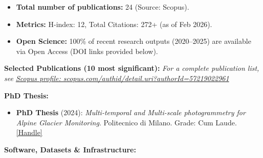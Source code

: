 \documentclass{cv_style} %
\begin{document}
\begin{itemize}[nosep]
    \item \textbf{Total number of publications:} 24 (Source: Scopus).
    \item \textbf{Metrics:} H-index: 12, Total Citations: 272+ (as of Feb 2026).
    \item \textbf{Open Science:} 100\% of recent research outputs (2020--2025) are available via Open Access (DOI links provided below).
\end{itemize}
\vspace{4pt}

\textbf{Selected Publications (10 most significant):} \vspace{-4pt}
\footnotesize
\nocite{
    gaspari2025glacier,
    ioli2024pfg,
    morelli2024coregistering,
    morelli2024toolbox,
    gaspari2024heritage,
    morelli2023slam,
    ioli2022rs,
    ioli2022bridge,
    gaspari2022integration,
    degaetani2021rs%
}
\printbibliography[heading=none] \vspace{-4pt}
\textit{For a complete publication list, see \href{https://www.scopus.com/authid/detail.uri?authorId=57219022961}{Scopus profile: scopus.com/authid/detail.uri?authorId=57219022961}}
\normalsize%

\vspace{4pt}
\textbf{PhD Thesis:}
\begin{itemize}[nosep]
    \item \textbf{PhD Thesis} (2024): \textit{Multi-temporal and Multi-scale photogrammetry for Alpine Glacier Monitoring}. Politecnico di Milano. Grade: Cum Laude. \href{https://hdl.handle.net/10589/224092}{[Handle]}
\end{itemize}

\vspace{4pt}
\textbf{Software, Datasets \& Infrastructure:}
\end{document}
